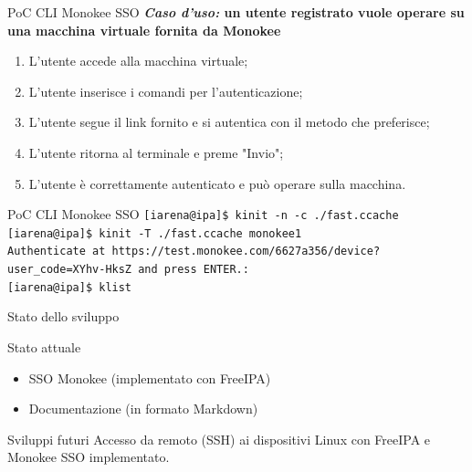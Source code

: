 \documentclass{beamer}
\newcommand{\code}[1]{\texttt{#1}}
\begin{document}
	\begin{frame}{PoC CLI Monokee SSO}
		\textbf{\textit{Caso d'uso:} un utente registrato vuole operare su una macchina virtuale fornita da Monokee}
		\vspace {.5em}
		\begin{enumerate}
			\item L'utente accede alla macchina virtuale;
			\item L'utente inserisce i comandi per l'autenticazione;
			\item L'utente segue il link fornito e si autentica con il metodo che preferisce;
			\item L'utente ritorna al terminale e preme "Invio";
			\item L'utente è correttamente autenticato e può operare sulla macchina.
		\end{enumerate}
	\end{frame}

	\begin{frame}{PoC CLI Monokee SSO}
		\code{[iarena@ipa]\$ kinit -n -c ./fast.ccache} \\
		\code{[iarena@ipa]\$ kinit -T ./fast.ccache monokee1} \\
		\code{Authenticate at https://test.monokee.com/6627a356/device?user\_code=XYhv-HksZ and press ENTER.:} \\
		\code{[iarena@ipa]\$ klist}
	\end{frame}
	\begin{frame}{Stato dello sviluppo}
				
		\begin{exampleblock}{Stato attuale}
			\begin{itemize}
				\item SSO Monokee (implementato con FreeIPA) \vspace{.5em}
				\item Documentazione (in formato Markdown) \vspace{.5em}
			\end{itemize}
		\end{exampleblock}
		
		\begin{block}{Sviluppi futuri}
			Accesso da remoto (SSH) ai dispositivi Linux con FreeIPA e Monokee SSO implementato.
		\end{block}
	
	\end{frame}
	
	
\end{document}

